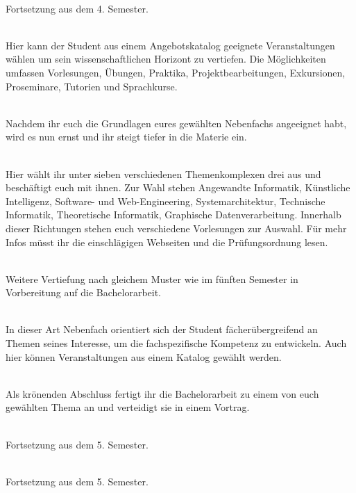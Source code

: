 \textbf{} \\
Fortsetzung aus dem 4. Semester.

\textbf{} \\
Hier kann der Student aus einem Angebotskatalog geeignete Veranstaltungen wählen um sein wissenschaftlichen Horizont zu vertiefen.
Die Möglichkeiten umfassen Vorlesungen, Übungen, Praktika, Projektbearbeitungen, Exkursionen, Proseminare, Tutorien und Sprachkurse.

\textbf{} \\
Nachdem ihr euch die Grundlagen eures gewählten Nebenfachs angeeignet habt, wird es nun ernst und ihr steigt tiefer in die Materie ein.

\textbf{} \\
Hier wählt ihr unter sieben verschiedenen Themenkomplexen drei aus und beschäftigt euch mit ihnen.
Zur Wahl stehen Angewandte Informatik, Künstliche Intelligenz, Software- und Web-Engineering, Systemarchitektur, Technische Informatik, Theoretische Informatik, Graphische Datenverarbeitung.
Innerhalb dieser Richtungen stehen euch verschiedene Vorlesungen zur Auswahl.
Für mehr Infos müsst ihr die einschlägigen Webseiten und die Prüfungsordnung lesen.

\hline

\textbf{} \\
Weitere Vertiefung nach gleichem Muster wie im fünften Semester in Vorbereitung auf die Bachelorarbeit.

\textbf{} \\
In dieser Art Nebenfach orientiert sich der Student fächerübergreifend an Themen seines Interesse, um die fachspezifische Kompetenz zu entwickeln.
Auch hier können Veranstaltungen aus einem Katalog gewählt werden.

\textbf{} \\
Als krönenden Abschluss fertigt ihr die Bachelorarbeit zu einem von euch gewählten Thema an und verteidigt sie in einem Vortrag.

\textbf{} \\
Fortsetzung aus dem 5. Semester.

\textbf{} \\
Fortsetzung aus dem 5. Semester.

